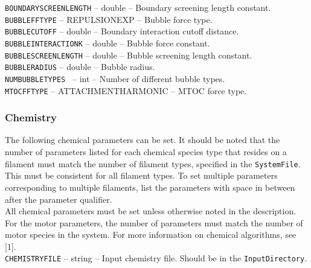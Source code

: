 \documentclass[11pt, oneside]{article}   	%
\begin{document}
     \noindent \texttt{BOUNDARYSCREENLENGTH} -- double -- Boundary screening length constant.\\
   
     \noindent \texttt{BUBBLEFFTYPE} -- REPULSIONEXP -- Bubble force type. \\
   
     \noindent  \texttt{BUBBLECUTOFF} -- double -- Boundary interaction cutoff distance.\\
   
     \noindent \texttt{BUBBLEINTERACTIONK} -- double -- Bubble force constant. \\
   
     \noindent \texttt{BUBBLESCREENLENGTH} -- double -- Bubble screening length constant.\\
   
     \noindent \texttt{BUBBLERADIUS} -- double -- Bubble radius.\\
   
     \noindent \texttt{NUMBUBBLETYPES } -- int -- Number of different bubble types.\\
     
      \noindent \texttt{MTOCFFTYPE} -- ATTACHMENTHARMONIC -- MTOC force type. \\

\normalsize

\subsubsection{Chemistry}

The following chemical parameters can be set. It should be noted that the number of parameters listed for each chemical species type that resides on a filament must match the number of filament types, specified in the \texttt{SystemFile}. This must be consistent for all filament types. To set multiple parameters corresponding to multiple filaments, list the parameters with space in between after the parameter qualifier. \\

\noindent All chemical parameters must be set unless otherwise noted in the description. For the motor parameters, the number of parameters must match the number of motor species in the system. For more information on chemical algorithms, see [1]. \\

\small
    \noindent\texttt{CHEMISTRYFILE} -- string -- Input chemistry file. Should be in the \texttt{InputDirectory}. \\
   
\end{document}
